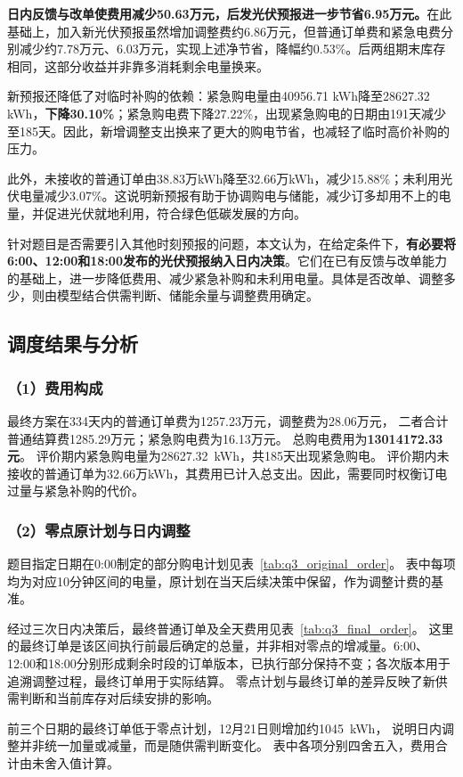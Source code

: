 \textbf{日内反馈与改单使费用减少50.63万元，后发光伏预报进一步节省6.95万元。}在此基础上，加入新光伏预报虽然增加调整费约6.86万元，但普通订单费和紧急电费分别减少约7.78万元、6.03万元，实现上述净节省，降幅约0.53\%。后两组期末库存相同，这部分收益并非靠多消耗剩余电量换来。

新预报还降低了对临时补购的依赖：紧急购电量由40956.71 kWh降至28627.32 kWh，\textbf{下降30.10\%}；紧急购电费下降27.22\%，出现紧急购电的日期由191天减少至185天。因此，新增调整支出换来了更大的购电节省，也减轻了临时高价补购的压力。

此外，未接收的普通订单由38.83万kWh降至32.66万kWh，减少15.88\%；未利用光伏电量减少3.07\%。这说明新预报有助于协调购电与储能，减少订多却用不上的电量，并促进光伏就地利用，符合绿色低碳发展的方向。

针对题目是否需要引入其他时刻预报的问题，本文认为，在给定条件下，\textbf{有必要将6:00、12:00和18:00发布的光伏预报纳入日内决策}。它们在已有反馈与改单能力的基础上，进一步降低费用、减少紧急补购和未利用电量。具体是否改单、调整多少，则由模型结合供需判断、储能余量与调整费用确定。

\FloatBarrier
\subsection{调度结果与分析}\label{sec:q3_dispatch_results}

\subsubsection*{（1）费用构成}

最终方案在334天内的普通订单费为1257.23万元，调整费为28.06万元，
二者合计普通结算费1285.29万元；紧急购电费为16.13万元。
总购电费用为\textbf{13014172.33元}。
评价期内紧急购电量为28627.32~kWh，共185天出现紧急购电。
评价期内未接收的普通订单为32.66万kWh，其费用已计入总支出。因此，需要同时权衡订电过量与紧急补购的代价。

\subsubsection*{（2）零点原计划与日内调整}

题目指定日期在0:00制定的部分购电计划见表~\ref{tab:q3_original_order}。
表中每项均为对应10分钟区间的电量，原计划在当天后续决策中保留，作为调整计费的基准。


经过三次日内决策后，最终普通订单及全天费用见表~\ref{tab:q3_final_order}。
这里的最终订单是该区间执行前最后确定的总量，并非相对零点的增减量。6:00、12:00和18:00分别形成剩余时段的订单版本，已执行部分保持不变；各次版本用于追溯调整过程，最终订单用于实际结算。
零点计划与最终订单的差异反映了新供需判断和当前库存对后续安排的影响。

前三个日期的最终订单低于零点计划，12月21日则增加约1045~kWh，
说明日内调整并非统一加量或减量，而是随供需判断变化。
表中各项分别四舍五入，费用合计由未舍入值计算。

